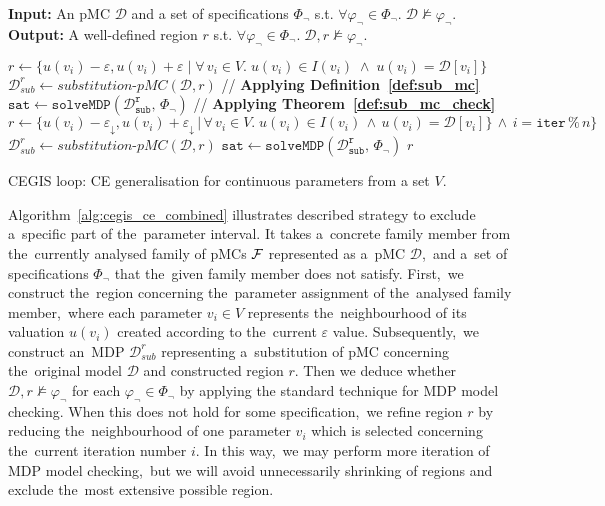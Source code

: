 \begin{algorithm}[h!]
\hspace*{\algorithmicindent} \textbf{Input:} An pMC $\mathcal{D}$ and a set of specifications $\varPhi_{\neg}$ s.t. $\forall \varphi_{\neg} \in \varPhi_{\neg}. \; \mathcal{D} \not\models \varphi_{\neg}$. \\
\hspace*{\algorithmicindent} \textbf{Output:} A well-defined region $r$ s.t. $\forall \varphi_{\neg} \in \varPhi_{\neg}. \; \mathcal{D}, r \not\models \varphi_{\neg}. $ \\
\vspace*{-1.5em}
\begin{algorithmic}[1]
    \STATE $r \leftarrow \{ u(v_i) - \varepsilon, u(v_i) + \varepsilon \; \lvert \; \forall \, v_i \in V. \; u(v_i) \in I(v_i) \; \land \; u(v_i) = \mathcal{D}[v_i]\}$
    \STATE $\mathcal{D}_{sub}^r \leftarrow \textit{substitution-pMC}(\mathcal{D}, r) $ \hfill // \textbf{Applying Definition~\ref{def:sub_mc}}
    \STATE $\mathtt{sat} \leftarrow \mathtt{solveMDP(\mathcal{D}_{sub}^r, \, \varPhi_{\neg})}$ \hfill // \textbf{Applying Theorem~\ref{def:sub_mc_check}}
        \STATE $r \leftarrow \{ u(v_i) - \varepsilon_\downarrow, u(v_i) + \varepsilon_\downarrow \, \lvert \, \forall \, v_i \in V. \; u(v_i) \in I(v_i) \, \land \, u(v_i) = \mathcal{D}[v_i]\} \, \land \, i = \texttt{iter} \, \% \, n \}$
        \STATE $\mathcal{D}_{sub}^r \leftarrow \textit{substitution-pMC}(\mathcal{D}, r) $
    \STATE $\mathtt{sat} \leftarrow \mathtt{solveMDP(\mathcal{D}_{sub}^r, \, \varPhi_{\neg})}$
    \ENDWHILE
    \RETURN $r$
\end{algorithmic}
\caption{CEGIS loop: CE generalisation for continuous parameters from a set $V$.}
\label{alg:cegis_ce_combined}
\end{algorithm}
Algorithm~\ref{alg:cegis_ce_combined} illustrates described strategy to exclude a~specific part of the~parameter interval.
It takes a~concrete family member from the~currently analysed family of pMCs $\mathcal{F}$ represented as a~pMC $\mathcal{D}$,~and a~set of specifications $\varPhi_{\neg}$ that the~given family member does not satisfy.
First,~we construct the~region concerning the~parameter assignment of the~analysed family member,~where each parameter $v_i \in V$ represents the~neighbourhood of its valuation $u(v_i)$ created according to the~current $\varepsilon$ value.
Subsequently,~we construct an~MDP $\mathcal{D}_{sub}^r$ representing a~substitution of pMC concerning the~original model $\mathcal{D}$ and constructed region $r$.
Then we deduce whether $\mathcal{D}, r \not\models \varphi_{\neg}$ for each $\varphi_{\neg} \in \varPhi_{\neg}$ by applying the standard technique for MDP model checking.
When this does not hold for some specification,~we refine region $r$ by reducing the~neighbourhood of one parameter $v_i$ which is selected concerning the~current iteration number $i$.
In this way,~we may perform more iteration of MDP model checking,~but we will avoid unnecessarily shrinking of regions and exclude the~most extensive possible region.

